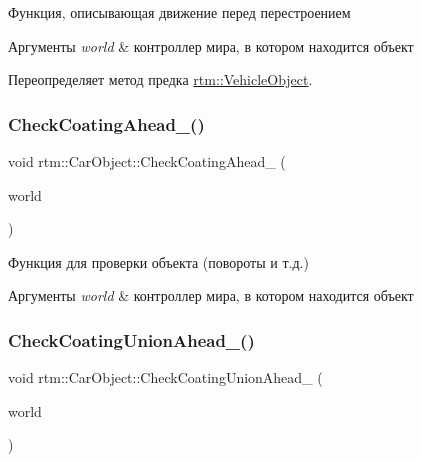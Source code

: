 Функция, описывающая движение перед перестроением 


\begin{DoxyParams}{Аргументы}
{\em world} & контроллер мира, в котором находится объект \\
\hline
\end{DoxyParams}


Переопределяет метод предка \hyperlink{classrtm_1_1_vehicle_object_a8976be533dfa4704f7b221c79d1fce99}{rtm\+::\+Vehicle\+Object}.

\mbox{\label{classrtm_1_1_car_object_a9e80c9029d84c425b43d6a0559d0c76c}} 
\subsubsection{\texorpdfstring{Check\+Coating\+Ahead\+\_\+()}{CheckCoatingAhead\_()}}
{\footnotesize\ttfamily void rtm\+::\+Car\+Object\+::\+Check\+Coating\+Ahead\+\_\+ (\begin{DoxyParamCaption}\item[{\hyperlink{classrtm_1_1_world_controller}{World\+Controller} $\ast$const}]{world }\end{DoxyParamCaption})\hspace{0.3cm}{\ttfamily [private]}}



Функция для проверки объекта (повороты и т.\+д.) 


\begin{DoxyParams}{Аргументы}
{\em world} & контроллер мира, в котором находится объект \\
\hline
\end{DoxyParams}
\mbox{\label{classrtm_1_1_car_object_a0cd1f15e3b28edde4271b92da250339f}} 
\subsubsection{\texorpdfstring{Check\+Coating\+Union\+Ahead\+\_\+()}{CheckCoatingUnionAhead\_()}}
{\footnotesize\ttfamily void rtm\+::\+Car\+Object\+::\+Check\+Coating\+Union\+Ahead\+\_\+ (\begin{DoxyParamCaption}\item[{\hyperlink{classrtm_1_1_world_controller}{World\+Controller} $\ast$const}]{world }\end{DoxyParamCaption})\hspace{0.3cm}{\ttfamily [private]}}



